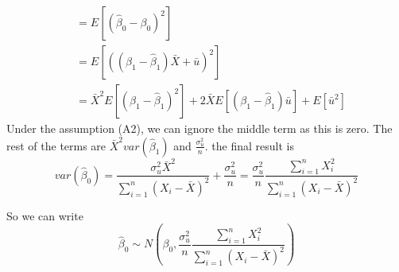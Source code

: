\documentclass[12pt]{article}
\theoremstyle{definition}
\theoremstyle{property}
\theoremstyle{assumption}
\theoremstyle{example}
\theoremstyle{comment}
\begin{document}
\begin{itemize}
\begin{itemize}
\[\begin{aligned}
&=E\left[\left(\hat{\beta}_0-{\beta}_0\right)^2\right]\\
&=E\left[\left( (\beta_1-\hat{\beta}_1)\bar{X}+\bar{u}\right)^2\right]\\
&=\bar{X}^2E\left[\left(\beta_1-\hat{\beta}_1 \right)^2\right]+ 2\bar{X}E\left[\left(\beta_1-\hat{\beta}_1 \right)\bar{u}\right] + E[\bar{u}^2]
\end{aligned}
\]
Under the assumption (A2), we can ignore the middle term as this is zero. The rest of the terms are $\bar{X}^2 var(\hat{\beta}_1)$ and $\frac{\sigma_u^2}{n}$. the final result is
\[
var(\hat{\beta}_0)=\frac{\sigma_u^2\bar{X}^2}{\sum_{i=1}^n(X_i-\bar{X})^2}+\frac{\sigma_u^2}{n}= \frac{\sigma_u^2}{n}\frac{\sum_{i=1}^nX_i^2}{\sum_{i=1}^n(X_i-\bar{X})^2}
\]
\end{itemize}
So we can write 
\[
\hat{\beta}_0 \sim N\left(\beta_0, \frac{\sigma_u^2}{n}\frac{\sum_{i=1}^nX_i^2}{\sum_{i=1}^n(X_i-\bar{X})^2}\right)
\]
\end{itemize}
\end{document}

